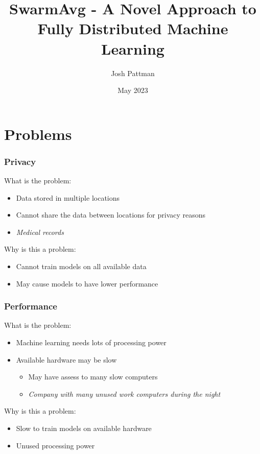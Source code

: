 \documentclass{beamer}
\title{SwarmAvg - A Novel Approach to Fully Distributed Machine Learning}
\author{Josh Pattman}
\institute{University Of Southampton}
\date{May 2023}
\begin{document}
	\frame{\titlepage}
	
	\section{Problems}
	\begin{frame}
		\frametitle{Privacy}
		What is the problem:
		\begin{itemize}
			\item Data stored in multiple locations
			\item Cannot share the data between locations for privacy reasons
			\item \emph{Medical records}
		\end{itemize}
	
		Why is this a problem:
		\begin{itemize}
			\item Cannot train models on all available data
			\item May cause models to have lower performance
		\end{itemize}
	\end{frame}

	\begin{frame}	
		\frametitle{Performance}
		What is the problem:
		\begin{itemize}
			\item Machine learning needs lots of processing power
			\item Available hardware may be slow
			\begin{itemize}
				\item May have assess to many slow computers
				\item \emph{Company with many unused work computers during the night}
			\end{itemize}
		\end{itemize}
		Why is this a problem:
		\begin{itemize}
			\item Slow to train models on available hardware
			\item Unused processing power
		\end{itemize}
	\end{frame}
\end{document}
